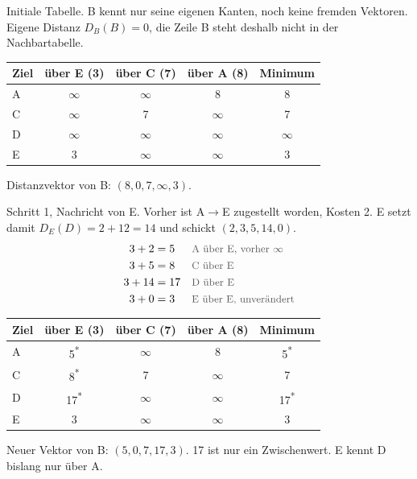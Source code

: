 \documentclass[a4paper,11pt]{article}
\newcommand{\why}[1]{\text{\small\color{black!65}#1}}
\newcommand{\stern}{\textsuperscript{*}}
\begin{document}
Initiale Tabelle. B kennt nur seine eigenen Kanten, noch keine fremden Vektoren. Eigene Distanz \(D_B(B)=0\), die Zeile B steht deshalb nicht in der Nachbartabelle.
\begin{center}
\begin{tabular}{@{}lcccc@{}}
\toprule
Ziel & über E (3) & über C (7) & über A (8) & Minimum \\
\midrule
A & \(\infty\) & \(\infty\) & 8 & 8 \\
C & \(\infty\) & 7 & \(\infty\) & 7 \\
D & \(\infty\) & \(\infty\) & \(\infty\) & \(\infty\) \\
E & 3 & \(\infty\) & \(\infty\) & 3 \\
\bottomrule
\end{tabular}
\end{center}
Distanzvektor von B: \((8,0,7,\infty,3)\).

Schritt 1, Nachricht von E. Vorher ist A\(\to\)E zugestellt worden, Kosten 2. E setzt damit \(D_E(D)=2+12=14\) und schickt \((2,3,5,14,0)\).
\begin{align*}
3+2 &= 5 && \why{A über E, vorher $\infty$}\\
3+5 &= 8 && \why{C über E}\\
3+14 &= 17 && \why{D über E}\\
3+0 &= 3 && \why{E über E, unverändert}
\end{align*}
\begin{center}
\begin{tabular}{@{}lcccc@{}}
\toprule
Ziel & über E (3) & über C (7) & über A (8) & Minimum \\
\midrule
A & 5\stern & \(\infty\) & 8 & 5\stern \\
C & 8\stern & 7 & \(\infty\) & 7 \\
D & 17\stern & \(\infty\) & \(\infty\) & 17\stern \\
E & 3 & \(\infty\) & \(\infty\) & 3 \\
\bottomrule
\end{tabular}
\end{center}
Neuer Vektor von B: \((5,0,7,17,3)\). 17 ist nur ein Zwischenwert. E kennt D bislang nur über A.
\end{document}
